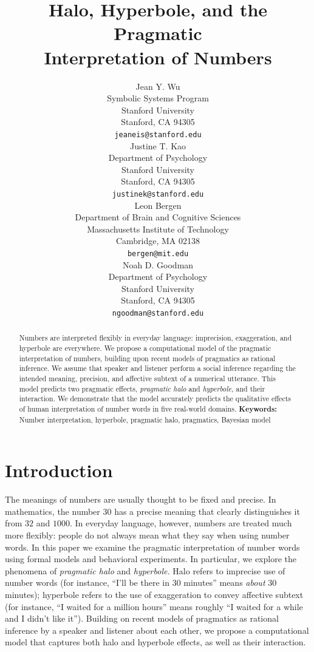 \documentclass{article} %
\title{Halo, Hyperbole, and the Pragmatic \\ Interpretation of Numbers}
\author{
Jean Y. Wu \\
Symbolic Systems Program\\
Stanford University\\
Stanford, CA 94305 \\
\texttt{jeaneis@stanford.edu} \\
\And
Justine T. Kao \\
Department of Psychology\\
Stanford University \\
Stanford, CA 94305 \\
\texttt{justinek@stanford.edu} \\
\AND
Leon Bergen \\
Department of Brain and Cognitive Sciences\\
Massachusetts Institute of Technology \\
Cambridge, MA 02138\\
\texttt{bergen@mit.edu} \\
\And
Noah D. Goodman \\
Department of Psychology\\
Stanford University \\ 
Stanford, CA 94305\\
\texttt{ngoodman@stanford.edu} \\
}
\begin{document}
\maketitle

\begin{abstract}
Numbers are interpreted flexibly in everyday language: imprecision, exaggeration, and hyperbole are everywhere. We propose a computational model of the pragmatic interpretation of numbers, building upon recent models of pragmatics as rational inference. We assume that speaker and listener perform a social inference regarding the intended meaning, precision, and affective subtext of a numerical utterance. This model predicts two pragmatic effects, \emph{pragmatic halo} and \emph{hyperbole,} and their interaction. We demonstrate that the model accurately predicts the qualitative effects of human interpretation of number words in five real-world domains.
\textbf{Keywords:} 
Number interpretation, hyperbole, pragmatic halo, pragmatics, Bayesian model
\end{abstract}


\section{Introduction}

The meanings of numbers are usually thought to be fixed and precise. In mathematics, the number $30$ has a precise meaning that clearly distinguishes it from $32$ and $1000$. In everyday language, however, numbers are treated much more flexibly: people do not always mean what they say when using number words. In this paper we examine the pragmatic interpretation of number words using formal models and behavioral experiments.
In particular, we explore the phenomena of \emph{pragmatic halo} and \emph{hyperbole.} Halo refers to imprecise use of number words (for instance, ``I'll be there in 30 minutes'' means \emph{about} 30 minutes); hyperbole refers to the use of exaggeration to convey affective subtext (for instance, ``I waited for a million hours'' means roughly ``I waited for a while and I didn't like it'').
Building on recent models of pragmatics as rational inference by a speaker and listener about each other, we propose a computational model that captures both halo and hyperbole effects, as well as their interaction.
\end{document}
